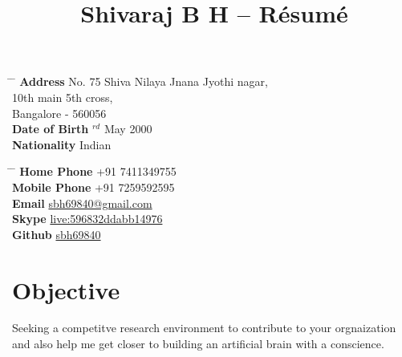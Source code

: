 \documentclass[10pt]{article} %
\begin{document}

\title{Shivaraj B H -- Résumé} %


\parbox{0.5\textwidth}{ %
\begin{tabbing} %
\hspace{3cm} \= \hspace{4cm} \= \kill %
{\bf Address} \> No. 75 Shiva Nilaya Jnana Jyothi nagar,\\ \> 10th main 5th cross,\\ %
\> Bangalore - 560056 \\ %
{\bf Date of Birth} $^{rd}$ May 2000 \\ %
{\bf Nationality} \> Indian %
\end{tabbing}}
\hfill %
\parbox{0.5\textwidth}{ %
\begin{tabbing} %
\hspace{3cm} \= \hspace{4cm} \= \kill %
{\bf Home Phone} \> +91 7411349755 \\ %
{\bf Mobile Phone} \> +91 7259592595\\ %
{\bf Email} \> \href{mailto:sbh69840@gmail.com}{sbh69840@gmail.com} \\ %
{\bf Skype} \> \href{https://join.skype.com/invite/hdfGrS04mvsL}{live:596832ddabb14976} \\ %

{\bf Github} \> \href{https://github.com/sbh69840}{sbh69840} \\ %
\end{tabbing}}


\section{Objective}
Seeking a competitve research environment to contribute to your orgnaization and also help me get closer to building an artificial brain with a conscience. 
\end{document}
